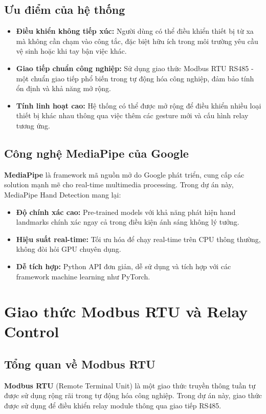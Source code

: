 \documentclass[12pt]{article}
\begin{document}
\subsection{Ưu điểm của hệ thống}
\begin{itemize}
    \item \textbf{Điều khiển không tiếp xúc:}  
    Người dùng có thể điều khiển thiết bị từ xa mà không cần chạm vào công tắc, đặc biệt hữu ích trong môi trường yêu cầu vệ sinh hoặc khi tay bận việc khác.

    \item \textbf{Giao tiếp chuẩn công nghiệp:}  
    Sử dụng giao thức Modbus RTU RS485 - một chuẩn giao tiếp phổ biến trong tự động hóa công nghiệp, đảm bảo tính ổn định và khả năng mở rộng.

    \item \textbf{Tính linh hoạt cao:}  
    Hệ thống có thể được mở rộng để điều khiển nhiều loại thiết bị khác nhau thông qua việc thêm các gesture mới và cấu hình relay tương ứng.
\end{itemize}

\subsection{Công nghệ MediaPipe của Google}
\textbf{MediaPipe} là framework mã nguồn mở do Google phát triển, cung cấp các solution mạnh mẽ cho real-time multimedia processing. Trong dự án này, MediaPipe Hand Detection mang lại:

\begin{itemize}
    \item \textbf{Độ chính xác cao:}  
    Pre-trained models với khả năng phát hiện hand landmarks chính xác ngay cả trong điều kiện ánh sáng không lý tưởng.

    \item \textbf{Hiệu suất real-time:}  
    Tối ưu hóa để chạy real-time trên CPU thông thường, không đòi hỏi GPU chuyên dụng.

    \item \textbf{Dễ tích hợp:}  
    Python API đơn giản, dễ sử dụng và tích hợp với các framework machine learning như PyTorch.
\end{itemize}

\section{Giao thức Modbus RTU và Relay Control}

\subsection{Tổng quan về Modbus RTU}
\textbf{Modbus RTU} (Remote Terminal Unit) là một giao thức truyền thông tuần tự được sử dụng rộng rãi trong tự động hóa công nghiệp. Trong dự án này, giao thức được sử dụng để điều khiển relay module thông qua giao tiếp RS485.
\end{document}
